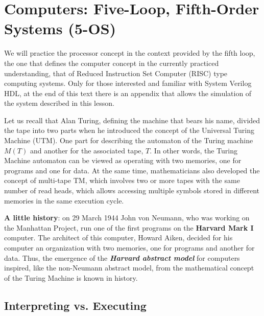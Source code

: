 \chapter{Computers: Five-Loop, Fifth-Order Systems (5-OS)}\label{lect6a}
\localtoc

We will practice the processor concept in the context provided by the fifth loop, the one that defines the computer concept in the currently practiced understanding, that of Reduced Instruction Set Computer (RISC) type computing systems. Only for those interested and familiar with System Verilog HDL, at the end of this text there is an appendix that allows the simulation of the system described in this lesson.

Let us recall that Alan Turing, defining the machine that bears his name, divided the tape into two parts when he introduced the concept of the Universal Turing Machine (UTM). One part for describing the automaton of the Turing machine $M(T)$ and another for the associated tape, $T$. In other words, the Turing Machine automaton can be viewed as operating with two memories, one for programs and one for data. At the same time, mathematicians also developed the concept of multi-tape TM, which involves two or more tapes with the same number of read heads, which allows accessing multiple symbols stored in different memories in the same execution cycle.

{\bf A little history}: on 29 March 1944 John von Neumann, who was working on the Manhattan Project, run one of the first programs  on the {\bf Harvard Mark I} computer. The architect of this computer, Howard Aiken, decided for his computer an organization with two memories, one for programs and another for data. Thus, the emergence of the {\bf {\em Harvard abstract model}} for computers inspired, like the non-Neumann abstract model, from the mathematical concept of the Turing Machine is known in history. 

\section{Interpreting vs. Executing}

